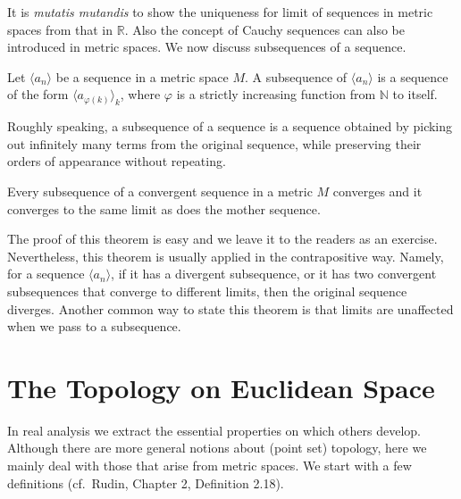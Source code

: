 It is \emph{mutatis mutandis} to show the uniqueness for limit of sequences in metric spaces from that in $\mathbb{R}$.
Also the concept of Cauchy sequences can also be introduced in metric spaces.
We now discuss subsequences of a sequence.

\begin{defn}
  Let $\langle a_n \rangle$ be a sequence in a metric space $M$.
  A \textsf{subsequence} of $\langle a_n \rangle$ is a sequence of the form $\langle a_{\varphi(k)} \rangle_k$, where $\varphi$ is a strictly increasing function from $\mathbb{N}$ to itself.
\end{defn}

Roughly speaking, a subsequence of a sequence is a sequence obtained by picking out infinitely many terms from the original sequence, while preserving their orders of appearance without repeating.

\begin{thm}
  Every subsequence of a convergent sequence in a metric $M$ converges and it converges to the same limit as does the mother sequence.
\end{thm}

The proof of this theorem is easy and we leave it to the readers as an exercise.
Nevertheless, this theorem is usually applied in the contrapositive way.
Namely, for a sequence $\langle a_n \rangle$, if it has a divergent subsequence, or it has two convergent subsequences that converge to different limits, then the original sequence diverges.
Another common way to state this theorem is that limits are unaffected when we pass to a subsequence.

\section{The Topology on Euclidean Space}
\label{sec:topology}

In real analysis we extract the essential properties on which others develop.
Although there are more general notions about (point set) topology, here we mainly deal with those that arise from metric spaces.
We start with a few definitions (cf.\ Rudin, Chapter 2, Definition 2.18).

